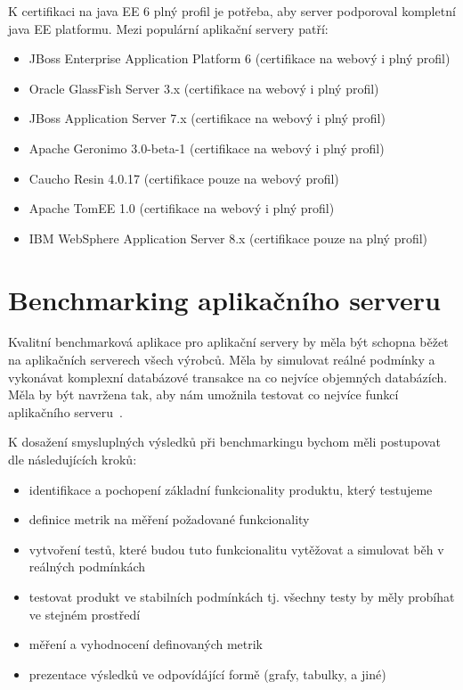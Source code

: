 \documentclass[122pt,oneside]{fithesis}
\begin{document}
K certifikaci na java EE 6 plný profil je potřeba, aby server podporoval kompletní java EE platformu.
Mezi populární aplikační servery patří:
\begin{itemize}
  \item JBoss Enterprise Application Platform 6 (certifikace na webový i plný profil)
  \item Oracle GlassFish Server 3.x (certifikace na webový i plný profil)
  \item JBoss Application Server 7.x (certifikace na webový i plný profil)
  \item Apache Geronimo 3.0-beta-1 (certifikace na webový i plný profil)
  \item Caucho Resin 4.0.17 (certifikace pouze na webový profil)
  \item Apache TomEE 1.0 (certifikace na webový i plný profil)
  \item IBM WebSphere Application Server 8.x (certifikace pouze na plný profil)
\end{itemize}

\section{Benchmarking aplikačního serveru}
Kvalitní benchmarková aplikace pro aplikační servery by měla být schopna běžet na aplikačních serverech všech výrobců. Měla by simulovat reálné podmínky a vykonávat komplexní databázové transakce na co nejvíce objemných databázích. Měla by být navržena tak, aby nám umožnila testovat co nejvíce funkcí aplikačního serveru~\cite{sybase}. 

K dosažení smysluplných výsledků při benchmarkingu bychom měli postupovat dle následujících kroků:
\begin{itemize}
  \item identifikace a pochopení základní funkcionality produktu, který testujeme
  \item definice metrik na měření požadované funkcionality
  \item vytvoření testů, které budou tuto funkcionalitu vytěžovat a simulovat běh v reálných podmínkách
  \item testovat produkt ve stabilních podmínkách tj. všechny testy by měly probíhat ve stejném prostředí
  \item měření a vyhodnocení definovaných metrik
  \item prezentace výsledků ve odpovídájící formě (grafy, tabulky, a jiné)
\end{itemize}
\end{document}
